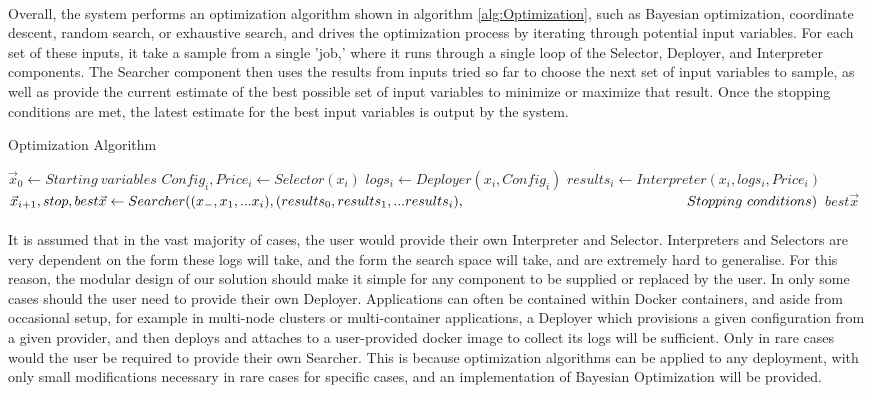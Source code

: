 \documentclass{report}
\begin{document}
\paragraph{}
Overall, the system performs an optimization algorithm shown in algorithm \ref{alg:Optimization}, such as Bayesian optimization, coordinate descent, random search, or exhaustive search, and drives the optimization process by iterating through potential input variables. For each set of these inputs, it take a sample from a single 'job,' where it runs through a single loop of the Selector, Deployer, and Interpreter components. The Searcher component then uses the results from inputs tried so far to choose the next set of input variables to sample, as well as provide the current estimate of the best possible set of input variables to minimize or maximize that result. Once the stopping conditions are met, the latest estimate for the best input variables is output by the system.

\begin{algorithm}
\caption{Optimization Algorithm}
\label{alg:Optimization}
\begin{algorithmic}
\State $\vec{x}_{0}\gets Starting \ variables$
\State $Config_i, Price_i\gets Selector(x_i)$
\State $logs_i \gets Deployer(x_i, Config_i)$
\State $results_i \gets Interpreter(x_i, logs_i, Price_i)$
\State $\vec{x}_{i+1}, stop, best\vec{x} \gets Searcher((x_-, x_1,...x_i), (results_0, results_1,...results_i),\newline
\hspace*{5.6cm}Stopping\ conditions)$
\State \Return $best\vec{x}$
\EndIf
\EndFor
\EndProcedure
\end{algorithmic}
\end{algorithm}
 

\paragraph{}
It is assumed that in the vast majority of cases, the user would provide their own Interpreter and Selector. Interpreters and Selectors are very dependent on the form these logs will take, and the form the search space will take, and are extremely hard to generalise. For this reason, the modular design of our solution should make it simple for any component to be supplied or replaced by the user. In only some cases should the user need to provide their own Deployer. Applications can often be contained within Docker containers, and aside from occasional setup, for example in multi-node clusters or multi-container applications, a Deployer which provisions a given configuration from a given provider, and then deploys and attaches to a user-provided docker image to collect its logs will be sufficient.  Only in rare cases would the user be required to provide their own Searcher. This is because optimization algorithms can be applied to any deployment, with only small modifications necessary in rare cases for specific cases, and an implementation of Bayesian Optimization will be provided. 
\end{document}

